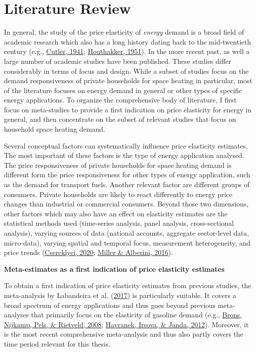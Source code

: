 \documentclass[12pt,twoside]{reedthesis}
\begin{document}
\hypertarget{review}{%
\section{Literature Review}\label{review}}

In general, the study of the price elasticity of \emph{energy} demand is a broad field of academic research which also has a long history dating back to the mid-twentieth century (e.g., \protect\hyperlink{ref-cutler41}{Cutler, 1941}; \protect\hyperlink{ref-houthakker51}{Houthakker, 1951}). In the more recent past, as well a large number of academic studies have been published. These studies differ considerably in terms of focus and design. While a subset of studies focus on the demand responsiveness of private households for space heating in particular, most of the literature focuses on energy demand in general or other types of specific energy applications. To organize the comprehensive body of literature, I first focus on meta-studies to provide a first indication on price elasticity for energy in general, and then concentrate on the subset of relevant studies that focus on household space heating demand.

Several conceptual factors can systematically influence price elasticity estimates. The most important of these factors is the type of energy application analysed. The price responsiveness of private households for space heating demand is different form the price responsiveness for other types of energy application, such as the demand for transport fuels. Another relevant factor are different groups of consumers. Private households are likely to react differently to energy price changes than industrial or commercial consumers. Beyond those two dimensions, other factors which may also have an effect on elasticity estimates are the statistical methods used (time-series analysis, panel analysis, cross-sectional analysis), varying sources of data (national accounts, aggregate sector-level data, micro-data), varying spatial and temporal focus, measurement heterogeneity, and price trends (\protect\hyperlink{ref-csereklyei20}{Csereklyei, 2020}; \protect\hyperlink{ref-miller_alberini16}{Miller \& Alberini, 2016}).

\textbf{Meta-estimates as a first indication of price elasticity estimates}

To obtain a first indication of price elasticity estimates from previous studies, the meta-analysis by Labandeira et al. (\protect\hyperlink{ref-labandeira_etal17}{2017}) is particularly suitable. It covers a broad spectrum of energy applications and thus goes beyond previous meta-analyses that primarily focus on the elasticity of gasoline demand (e.g., \protect\hyperlink{ref-brons_etal08}{Brons, Nijkamp, Pels, \& Rietveld, 2008}; \protect\hyperlink{ref-havranek_etal12}{Havranek, Irsova, \& Janda, 2012}). Moreover, it is the most recent comprehensive meta-analysis and thus also partly covers the time period relevant for this thesis.
\end{document}
